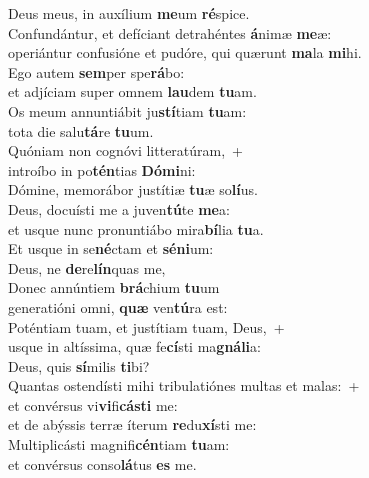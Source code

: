 \oddverse Deus meus, in auxílium \textbf{me}um \textbf{ré}spice.\\
\evenverse Confundántur, et defíciant detrahéntes \textbf{á}nimæ \textbf{me}æ:~\*\\
\evenverse operiántur confusióne et pudóre, qui quærunt \textbf{ma}la \textbf{mi}hi.\\
\oddverse Ego autem \textbf{sem}per spe\textbf{rá}bo:~\*\\
\oddverse et adjíciam super omnem \textbf{lau}dem \textbf{tu}am.\\
\evenverse Os meum annuntiábit ju\textbf{stí}tiam \textbf{tu}am:~\*\\
\evenverse tota die salu\textbf{tá}re \textbf{tu}um.\\
\oddverse Quóniam non cognóvi litteratúram,~+\\
\oddverse  introíbo in po\textbf{tén}tias \textbf{Dó}\textbf{mi}ni:~\*\\
\oddverse Dómine, memorábor justítiæ \textbf{tu}æ so\textbf{lí}us.\\
\evenverse Deus, docuísti me a juven\textbf{tú}te \textbf{me}a:~\*\\
\evenverse et usque nunc pronuntiábo mira\textbf{bí}lia \textbf{tu}a.\\
\oddverse Et usque in se\textbf{né}ctam et \textbf{sé}\textbf{ni}um:~\*\\
\oddverse Deus, ne \textbf{de}re\textbf{lín}quas me,\\
\evenverse Donec annúntiem \textbf{brá}chium \textbf{tu}um~\*\\
\evenverse generatióni omni, \textbf{quæ} ven\textbf{tú}ra est:\\
\oddverse Poténtiam tuam, et justítiam tuam, Deus,~+\\
\oddverse  usque in altíssima, quæ fe\textbf{cí}sti ma\textbf{gná}\textbf{li}a:~\*\\
\oddverse Deus, quis \textbf{sí}milis \textbf{ti}bi?\\
\evenverse Quantas ostendísti mihi tribulatiónes multas et malas:~+\\
\evenverse  et convérsus vi\textbf{vi}fi\textbf{cá}\textbf{sti} me:~\*\\
\evenverse et de abýssis terræ íterum \textbf{re}du\textbf{xí}sti me:\\
\oddverse Multiplicásti magnifi\textbf{cén}tiam \textbf{tu}am:~\*\\
\oddverse et convérsus conso\textbf{lá}tus \textbf{es} me.\\
